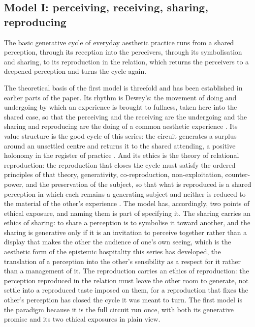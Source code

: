 \subsection{Model I: perceiving, receiving, sharing, reproducing}
\label{p23:sub:typ-model1}

\begin{claim}[Model I]
The basic generative cycle of everyday aesthetic practice runs from a shared perception, through its reception into the perceivers, through its symbolisation and sharing, to its reproduction in the relation, which returns the perceivers to a deepened perception and turns the cycle again.
\end{claim}

The theoretical basis of the first model is threefold and has been established in earlier parts of the paper. Its rhythm is Dewey's: the movement of doing and undergoing by which an experience is brought to fullness, taken here into the shared case, so that the perceiving and the receiving are the undergoing and the sharing and reproducing are the doing of a common aesthetic experience \parencite{dewey1934}. Its value structure is the good cycle of this series: the circuit generates a surplus around an unsettled centre and returns it to the shared attending, a positive holonomy in the register of practice \parencite{paperix,berry1984}. And its ethics is the theory of relational reproduction: the reproduction that closes the cycle must satisfy the ordered principles of that theory, generativity, co-reproduction, non-exploitation, counter-power, and the preservation of the subject, so that what is reproduced is a shared perception in which each remains a generating subject and neither is reduced to the material of the other's experience \parencite{wanreproduction}. The model has, accordingly, two points of ethical exposure, and naming them is part of specifying it. The sharing carries an ethics of sharing: to share a perception is to symbolise it toward another, and the sharing is generative only if it is an invitation to perceive together rather than a display that makes the other the audience of one's own seeing, which is the aesthetic form of the epistemic hospitality this series has developed, the translation of a perception into the other's sensibility as a respect for it rather than a management of it. The reproduction carries an ethics of reproduction: the perception reproduced in the relation must leave the other room to generate, not settle into a reproduced taste imposed on them, for a reproduction that fixes the other's perception has closed the cycle it was meant to turn. The first model is the paradigm because it is the full circuit run once, with both its generative promise and its two ethical exposures in plain view.

